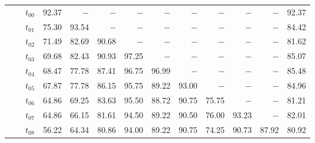 \begin{table}[ht]
\begin{tabular}{@{}l l l *{10}{r}@{}}
 & & $t_{00}$ & 92.37 & $-$ & $-$ & $-$ & $-$ & $-$ & $-$ & $-$ & $-$ & 92.37 \\
 & & $t_{01}$ & 75.30 & 93.54 & $-$ & $-$ & $-$ & $-$ & $-$ & $-$ & $-$ & 84.42 \\
 & & $t_{02}$ & 71.49 & 82.69 & 90.68 & $-$ & $-$ & $-$ & $-$ & $-$ & $-$ & 81.62 \\
 & & $t_{03}$ & 69.68 & 82.43 & 90.93 & 97.25 & $-$ & $-$ & $-$ & $-$ & $-$ & 85.07 \\
 & & $t_{04}$ & 68.47 & 77.78 & 87.41 & 96.75 & 96.99 & $-$ & $-$ & $-$ & $-$ & 85.48 \\
 & & $t_{05}$ & 67.87 & 77.78 & 86.15 & 95.75 & 89.22 & 93.00 & $-$ & $-$ & $-$ & 84.96 \\
 & & $t_{06}$ & 64.86 & 69.25 & 83.63 & 95.50 & 88.72 & 90.75 & 75.75 & $-$ & $-$ & 81.21 \\
 & & $t_{07}$ & 64.86 & 66.15 & 81.61 & 94.50 & 89.22 & 90.50 & 76.00 & 93.23 & $-$ & 82.01 \\
 & & $t_{08}$ & 56.22 & 64.34 & 80.86 & 94.00 & 89.22 & 90.75 & 74.25 & 90.73 & 87.92 & 80.92 \\
\bottomrule
\end{tabular}
\end{table}

